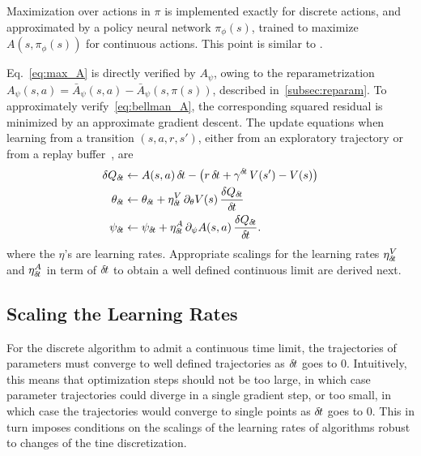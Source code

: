 Maximization over actions in $\pi$ is implemented exactly for discrete actions,
and approximated by a policy neural network $\pi_\phi(s)$, trained to maximize $A(s,
\pi_\phi(s))$ for continuous actions. This point is similar to
\cite{ddpg}.

Eq.~\eqref{eq:max_A}
is directly verified by $A_{\psi}$, owing to the reparametrization
$A_\psi(s, a) = \bar{A}_\psi(s, a) - \bar{A}_\psi(s, \pi(s))$, described
in~\ref{subsec:reparam}.  To approximately verify~\eqref{eq:bellman_A}, the
corresponding squared residual is minimized by an approximate gradient descent.
The update equations when learning from a transition $(s, a, r, s')$, either from
an exploratory trajectory or from a replay buffer~\cite{dqn}, are
\begin{align}
	\delta Q_{\delta\hspace{-.1em}t} &\leftarrow A(s, a)\, {\delta\hspace{-.1em}t} - \left(r
	\,{\delta\hspace{-.1em}t} + \gamma^{{\delta\hspace{-.1em}t}}\, V(s') - V(s)\right)\\
	\theta_{\delta\hspace{-.1em}t} &\leftarrow \theta_{\delta\hspace{-.1em}t} + \eta^V_{\delta\hspace{-.1em}t}
	\,\partial_{\theta} V(s) \,\frac{\delta Q_{\delta\hspace{-.1em}t}}{{\delta\hspace{-.1em}t}}\\
	\psi_{\delta\hspace{-.1em}t} &\leftarrow \psi_{\delta\hspace{-.1em}t} + \eta^A_{\delta\hspace{-.1em}t}
	\,\partial_{\psi} A(s, a) \,\frac{\delta Q_{\delta\hspace{-.1em}t}}{{\delta\hspace{-.1em}t}}.
	\label{eq:approx_bellman_A}
\end{align} 
where the $\eta$'s are learning rates.
Appropriate scalings for the learning rates $\eta^V_{\delta\hspace{-.1em}t}$ and
$\eta^A_{\delta\hspace{-.1em}t}$ in term of ${\delta\hspace{-.1em}t}$ to obtain a well defined continuous
limit are derived next.


\subsection{Scaling the Learning Rates}
\label{subsec:lr}

For the discrete algorithm to admit a continuous time limit, the trajectories
of parameters must converge to well defined trajectories as ${\delta\hspace{-.1em}t}$ goes to
$0$.  Intuitively, this means that optimization steps should not be too large,
in which case parameter trajectories could diverge in a single gradient step,
or too small, in which case the trajectories would converge to single points as
${\delta\hspace{-.1em}t}$ goes to $0$.  This in turn imposes conditions on the scalings of the
learning rates of algorithms robust to changes of the tine discretization.

